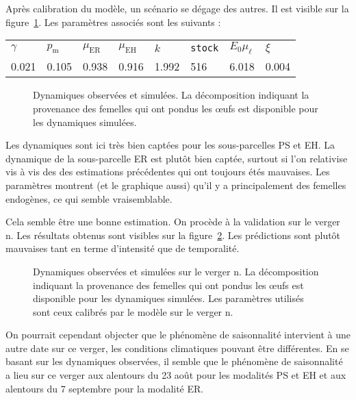 Après calibration du modèle, un scénario se dégage des autres.
Il est visible sur la figure~\ref{fig:D}.
Les paramètres associés sont les suivants :
\begin{center}
\begin{tabular}{llllllll}
$\gamma$ & $p_{\text{m}}$ & $\mu_{\text{ER}}$ & $\mu_{\text{EH}}$ & $k$ & \texttt{stock} & $E_0\mu_{\ell}$ & $\xi$\\
0.021 & 0.105 & 0.938 & 0.916 & 1.992 & 516 & 6.018 & 0.004
\end{tabular}
\end{center}


\begin{figure}[ht]
 \centering
 \caption{Dynamiques observées et simulées. La décomposition indiquant la provenance des femelles qui ont pondus les œufs est disponible pour les dynamiques simulées.}
 \label{fig:D}
\end{figure}


Les dynamiques sont ici très bien captées pour les sous-parcelles PS et EH.
La dynamique de la sous-parcelle ER est plutôt bien captée, surtout si l'on relativise vis à vis des des estimations précédentes qui ont toujours étés mauvaises.
Les paramètres montrent (et le graphique aussi) qu'il y a principalement des femelles endogènes, ce qui semble vraisemblable.



Cela semble être une bonne estimation.
On procède à la validation sur le verger n.
Les résultats obtenus sont visibles sur la figure~\ref{fig:vg2_15s}.
Les prédictions sont plutôt mauvaises tant en terme d'intensité que de temporalité.

\begin{figure}[ht]
 \centering
 \caption{Dynamiques observées et simulées sur le verger n. La décomposition indiquant la provenance des femelles qui ont pondus les œufs est disponible pour les dynamiques simulées.
 Les paramètres utilisés sont ceux calibrés par le modèle sur le verger n.}
 \label{fig:vg2_15s}
\end{figure}


On pourrait cependant objecter que le phénomène de saisonnalité intervient à une autre date sur ce verger, les conditions climatiques pouvant être différentes.
En se basant sur les dynamiques observées, il semble que le phénomène de saisonnalité a lieu sur ce verger aux alentours du 23 août pour les modalités PS et EH et aux alentours du 7 septembre pour la modalité ER.

